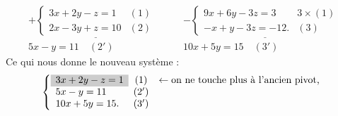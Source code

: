                               \[
                                    \begin{matrix}
		                                          +
		                                    \underline{
			                                    \left\lbrace
				                                    \begin{array}{lc}
				                                          3 x + 2 y -   z =   1  & (1) \\
				                                          2 x - 3 y +   z =  10  & (2) 
				                                    \end{array}
			                                    \right.
			                              }
			                              \\
	                                                5 x - y = 11 \quad (2')
	                              \end{matrix}
                                    \qquad
                                    \begin{matrix}
		                                          -
		                                    \underline{
			                                    \left\lbrace
				                                    \begin{array}{lc}
				                                          9 x + 6 y - 3 z =   3  & 3\times(1) \\
				                                          - x +   y - 3 z = -12. & (3)
				                                    \end{array}
			                                    \right.                                    
			                              }
			                              \\
			                              10 x + 5 y = 15 \quad (3')
                                    \end{matrix}
                              \]
                              Ce qui nous donne le nouveau syst\`eme :
                              \[
                                    \left\lbrace
	                                    \begin{array}{lcl}
	                                          \cellcolor[gray]{0.8} 3 x + 2 y -   z =   1  
	                                                & (1) 
	                                                      & \leftarrow \text{on ne touche plus \`a l'ancien pivot,}  \\
	                                          5 x - y         =  11  & (2') & \\
	                                          10 x + 5 y      =  15. & (3') & \\
	                                    \end{array}
                                    \right.
                              \]
